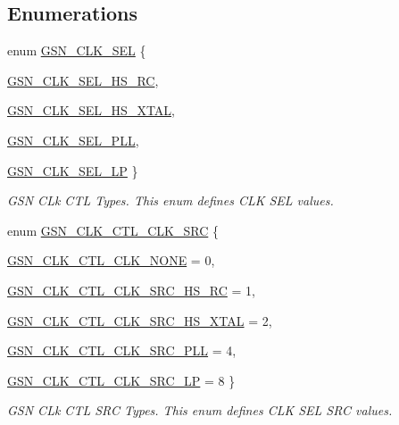 \subsection*{Enumerations}
\begin{DoxyCompactItemize}
\item 
enum \hyperlink{a00644_ga1b0f0bc3777cd50abe5f39797df023b5}{GSN\_\-CLK\_\-SEL} \{ \par
\hyperlink{a00644_gga1b0f0bc3777cd50abe5f39797df023b5a6d77f67c5fe2d58a1800d47a3405bdbb}{GSN\_\-CLK\_\-SEL\_\-HS\_\-RC}, 
\par
\hyperlink{a00644_gga1b0f0bc3777cd50abe5f39797df023b5a84a3dddc792558a0c75441bf1d6cb991}{GSN\_\-CLK\_\-SEL\_\-HS\_\-XTAL}, 
\par
\hyperlink{a00644_gga1b0f0bc3777cd50abe5f39797df023b5a67004660ec5d9c601cb897e7feb94047}{GSN\_\-CLK\_\-SEL\_\-PLL}, 
\par
\hyperlink{a00644_gga1b0f0bc3777cd50abe5f39797df023b5acdcf68cddce2291868ff3ad7223e7b05}{GSN\_\-CLK\_\-SEL\_\-LP}
 \}
\begin{DoxyCompactList}\small\item\em GSN CLk CTL Types. This enum defines CLK SEL values. \end{DoxyCompactList}\item 
enum \hyperlink{a00644_ga53f0e57a2fa30eef772141f9ac772202}{GSN\_\-CLK\_\-CTL\_\-CLK\_\-SRC} \{ \par
\hyperlink{a00644_gga53f0e57a2fa30eef772141f9ac772202a778d05cc32c381d03f443ac3a8cfe4c9}{GSN\_\-CLK\_\-CTL\_\-CLK\_\-NONE} =  0, 
\par
\hyperlink{a00644_gga53f0e57a2fa30eef772141f9ac772202a02bb61fbda65f8b12d2a10e7cea70246}{GSN\_\-CLK\_\-CTL\_\-CLK\_\-SRC\_\-HS\_\-RC} =  1, 
\par
\hyperlink{a00644_gga53f0e57a2fa30eef772141f9ac772202abad63f96e1fa920dacacee0a840414fc}{GSN\_\-CLK\_\-CTL\_\-CLK\_\-SRC\_\-HS\_\-XTAL} =  2, 
\par
\hyperlink{a00644_gga53f0e57a2fa30eef772141f9ac772202ae43332cf79f679999752978cc45713f3}{GSN\_\-CLK\_\-CTL\_\-CLK\_\-SRC\_\-PLL} =  4, 
\par
\hyperlink{a00644_gga53f0e57a2fa30eef772141f9ac772202ae05644f7e6452d1a1d374c212763ec06}{GSN\_\-CLK\_\-CTL\_\-CLK\_\-SRC\_\-LP} =  8
 \}
\begin{DoxyCompactList}\small\item\em GSN CLk CTL SRC Types. This enum defines CLK SEL SRC values. \end{DoxyCompactList}\item 

\end{DoxyCompactItemize}
